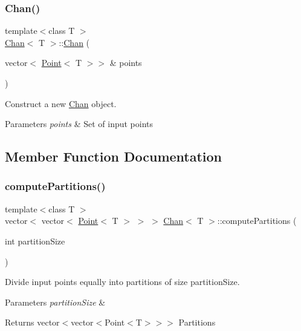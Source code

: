 \subsubsection{\texorpdfstring{Chan()}{Chan()}}
{\footnotesize\ttfamily template$<$class T $>$ \\
\mbox{\hyperlink{classChan}{Chan}}$<$ T $>$\+::\mbox{\hyperlink{classChan}{Chan}} (\begin{DoxyParamCaption}\item[{vector$<$ \mbox{\hyperlink{classPoint}{Point}}$<$ T $>$$>$ \&}]{points }\end{DoxyParamCaption})}



Construct a new \mbox{\hyperlink{classChan}{Chan}} object. 


\begin{DoxyParams}{Parameters}
{\em points} & Set of input points \\
\hline
\end{DoxyParams}


\subsection{Member Function Documentation}
\mbox{\label{classChan_a6c42d1c1eab98ab7fb9a3a851f51f305}} 
\subsubsection{\texorpdfstring{compute\+Partitions()}{computePartitions()}}
{\footnotesize\ttfamily template$<$class T $>$ \\
vector$<$ vector$<$ \mbox{\hyperlink{classPoint}{Point}}$<$ T $>$ $>$ $>$ \mbox{\hyperlink{classChan}{Chan}}$<$ T $>$\+::compute\+Partitions (\begin{DoxyParamCaption}\item[{int}]{partition\+Size }\end{DoxyParamCaption})\hspace{0.3cm}{\ttfamily [private]}}



Divide input points equally into partitions of size \textquotesingle{}partition\+Size\textquotesingle{}. 


\begin{DoxyParams}{Parameters}
{\em partition\+Size} & \\
\hline
\end{DoxyParams}
\begin{DoxyReturn}{Returns}
vector$<$vector$<$Point$<$\+T$>$$>$$>$ Partitions 
\end{DoxyReturn}
\mbox{\label{classChan_a3cfcc1c908e1b4fde9bddb33d1af6d65}} 
